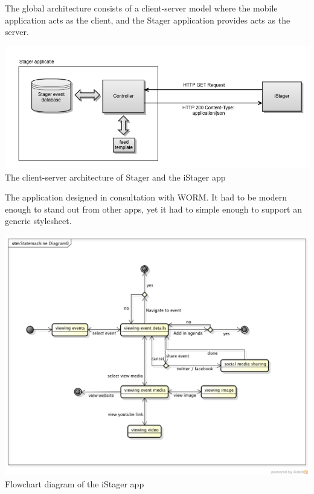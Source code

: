 The global architecture consists of a client-server model where the mobile application acts as the client, and the Stager application provides acts as the server.

\begin{centering}
	\includegraphics[scale=0.4]{images/globale_architectuur.png}\\{The client-server architecture of Stager and the iStager app}\\
\end{centering}

The application designed in consultation with WORM. It had to be modern enough to stand out from other apps, yet it had to simple enough to support an generic stylesheet.


\begin{centering}
	\includegraphics[scale=0.4]{images/stagerapp_statediagram.png}\\{Flowchart diagram of the iStager app}\\
\end{centering}


